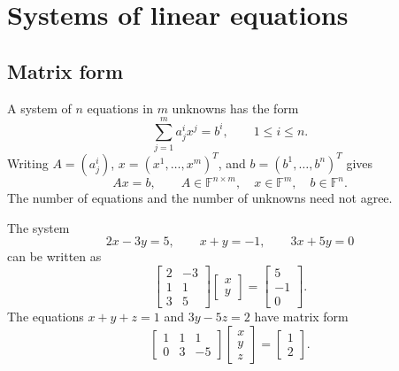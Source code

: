 \section{Systems of linear equations}
\label{sec:linear-algebra-i:systems-of-linear-equations}

\subsection{Matrix form}

A system of \(n\) equations in \(m\) unknowns has the form
\[
  \sum_{j=1}^m a^i_jx^j=b^i,\qquad 1\leq i\leq n.
\]
Writing \(A=(a^i_j)\), \(x=(x^1,\ldots,x^m)^T\), and
\(b=(b^1,\ldots,b^n)^T\) gives
\[
  Ax=b,\qquad
  A\in\mathbb F^{n\times m},\quad x\in\mathbb F^m,\quad b\in\mathbb F^n.
\]
The number of equations and the number of unknowns need not agree.

\begin{example}
  The system
  \[
    2x-3y=5,\qquad x+y=-1,\qquad 3x+5y=0
  \]
  can be written as
  \[
    \begin{bmatrix}2&-3\\1&1\\3&5\end{bmatrix}
    \begin{bmatrix}x\\y\end{bmatrix}
    =\begin{bmatrix}5\\-1\\0\end{bmatrix}.
  \]
  The equations \(x+y+z=1\) and \(3y-5z=2\) have matrix form
  \[
    \begin{bmatrix}1&1&1\\0&3&-5\end{bmatrix}
    \begin{bmatrix}x\\y\\z\end{bmatrix}
    =\begin{bmatrix}1\\2\end{bmatrix}.
  \]
\end{example}

